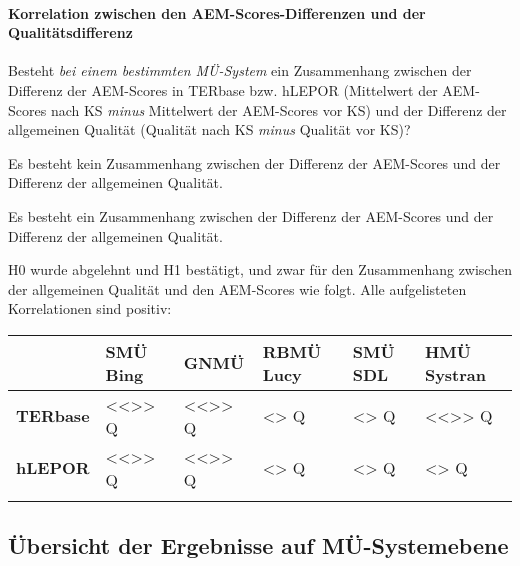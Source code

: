 \paragraph*{Korrelation zwischen den AEM-Scores-Differenzen und der Qualitätsdifferenz}
\begin{description}[font=\normalfont\bfseries]
\item [Fragestellung:] Besteht \textit{bei einem bestimmten MÜ-System} ein Zusammenhang zwischen der Differenz der AEM-Scores in TERbase bzw. hLEPOR (Mittelwert der AEM-Scores nach KS \textit{minus} Mittelwert der AEM-Scores vor KS) und der Differenz der allgemeinen Qualität  (Qualität nach KS \textit{minus} Qualität vor KS)?
\item [H0 --] Es besteht kein Zusammenhang zwischen der Differenz der AEM-Scores und der Differenz der allgemeinen Qualität.
\item [H1 --] Es besteht ein Zusammenhang zwischen der Differenz der AEM-Scores und der Differenz der allgemeinen Qualität.
\item [Resultat:] H0 wurde abgelehnt und H1 bestätigt, und zwar für den Zusammenhang zwischen der allgemeinen Qualität und den AEM-Scores wie folgt. Alle aufgelisteten Korrelationen sind positiv:
\end{description}
\begin{center}
\begin{small}
\begin{tabularx}{.93\textwidth}{llllll}
\lsptoprule
& {\textbf{SMÜ Bing}} & {\textbf{GNMÜ}} & {\textbf{RBMÜ Lucy}} & {\textbf{SMÜ SDL}} & {\textbf{HMÜ Systran}}\\
\midrule
\textbf{TERbase} & \cellcolor{smGreen}<{}<{}>{}> Q & \cellcolor{smGreen}<{}<{}>{}> Q & \cellcolor{smGreen}<> Q & \cellcolor{smGreen}<> Q & \cellcolor{smGreen}<{}<{}>{}> Q\\
\textbf{hLEPOR} & \cellcolor{smGreen}<{}<{}>{}> Q &\cellcolor{smGreen} <{}<{}>{}> Q & \cellcolor{smGreen}<> Q &\cellcolor{smGreen} <> Q & \cellcolor{smGreen}<> Q\\
\lspbottomrule
\end{tabularx}
\end{small}
\end{center}









\subsection{Übersicht der Ergebnisse auf MÜ-Systemebene}
\label{sec:5.4.11}

